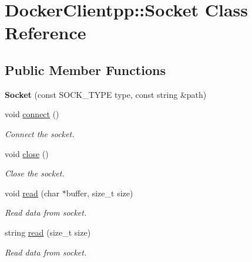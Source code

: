 \hypertarget{classDockerClientpp_1_1Socket}{}\section{Docker\+Clientpp\+::Socket Class Reference}
\label{classDockerClientpp_1_1Socket}
\subsection*{Public Member Functions}
\begin{DoxyCompactItemize}
\item 
\mbox{\label{classDockerClientpp_1_1Socket_a37d1fc00142652786912a5cefca1fa60}} 
{\bfseries Socket} (const S\+O\+C\+K\+\_\+\+T\+Y\+PE type, const string \&path)
\item 
\mbox{\label{classDockerClientpp_1_1Socket_a16d0b0e026c4064ffdc1d0feb4ea43c4}} 
void \mbox{\hyperlink{classDockerClientpp_1_1Socket_a16d0b0e026c4064ffdc1d0feb4ea43c4}{connect}} ()
\begin{DoxyCompactList}\small\item\em Connect the socket. \end{DoxyCompactList}\item 
\mbox{\label{classDockerClientpp_1_1Socket_aa169b56ee8b27d4e89536377585b7e72}} 
void \mbox{\hyperlink{classDockerClientpp_1_1Socket_aa169b56ee8b27d4e89536377585b7e72}{close}} ()
\begin{DoxyCompactList}\small\item\em Close the socket. \end{DoxyCompactList}\item 
void \mbox{\hyperlink{classDockerClientpp_1_1Socket_a4251c9810d1a86c6dc95ee6ae4a870ba}{read}} (char $\ast$buffer, size\+\_\+t size)
\begin{DoxyCompactList}\small\item\em Read data from socket. \end{DoxyCompactList}\item 
string \mbox{\hyperlink{classDockerClientpp_1_1Socket_a271a149d410a61edcd4630ad9b8897fc}{read}} (size\+\_\+t size)
\begin{DoxyCompactList}\small\item\em Read data from socket. \end{DoxyCompactList}\item 

\end{DoxyCompactItemize}
